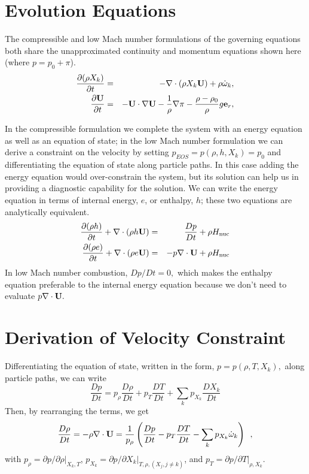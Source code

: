 \section{Evolution Equations}

The compressible and low Mach number formulations of the governing
equations both share the unapproximated continuity and momentum equations
shown here (where $p = p_0 + \pi$).
\begin{eqnarray}
\frac{\partial(\rho X_k)}{\partial t} &=& -\nabla\cdot(\rho X_k{\bf U}) + 
\rho\dot{\omega}_k,\label{enth:eq:species}\\
\frac{\partial{\bf U}}{\partial t} &=& -{\bf U}\cdot\nabla{\bf U}  - 
  \frac{1}{\rho}\nabla\pi - 
  \frac{\rho-\rho_0}{\rho} g{\bf e}_r,\label{eq:momentum}
\end{eqnarray}

In the compressible formulation we complete the system with an energy
equation as well as an equation of state; in the low Mach number
formulation we can derive a constraint on the velocity by setting
$p_{EOS} = p(\rho,h,X_k) = p_0$ and differentiating the equation of
state along particle paths.  In this case adding the energy equation
would over-constrain the system, but its solution can help us in
providing a diagnostic capability for the solution.  We can write the
energy equation in terms of internal energy, $e$, or enthalpy, $h$;
these two equations are analytically equivalent.
\begin{eqnarray}
\frac{\partial(\rho h)}{\partial t} + \nabla\cdot(\rho h\Ub) 
 &=& \frac{Dp}{Dt} + \rho\Hnuc \nonumber \\
%
\frac{\partial(\rho e)}{\partial t} + \nabla\cdot(\rho e \Ub)
 &=& - p\nabla\cdot \Ub + \rho\Hnuc \nonumber 
\end{eqnarray}
In low Mach number combustion, $Dp/Dt = 0,$ which makes the enthalpy
equation preferable to the internal energy equation because we don't
need to evaluate $p \nabla \cdot {\bf U}.$


\section{Derivation of Velocity Constraint}

Differentiating the equation of state, written in the form, $p =
p(\rho,T,X_k),$ along particle paths, we can write
\begin{equation}
\frac{D p}{Dt}  = p_\rho \frac{D \rho}{Dt} + p_T \frac{D T}{Dt} + \sum_k p_{X_k} \frac{D X_k}{Dt}
\end{equation}
Then, by rearranging the terms, we get
\begin{equation}
\frac{D \rho}{Dt}  = -\rho \nabla \cdot {\bf U} = 
    \frac{1}{p_\rho}
    \left( \frac{D p}{Dt} - p_T \frac{D T}{Dt}
                          - \sum_k p_{X_k} {\dot{\omega}}_k \right) \enskip ,
\end{equation}
with $p_\rho = \left.\partial p/\partial \rho\right|_{X_k,T}$,
$p_{X_k} = \left.\partial p/\partial X_k \right|_{T,\rho,(X_j,j\ne k)}$,
and $p_T = \left.\partial p/\partial T\right|_{\rho,X_k}$.

